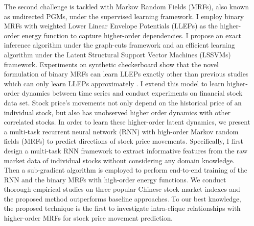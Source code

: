 The second challenge is tackled with Markov Random Fields (MRFs),
also known as undirected PGMs, under the supervised learning
framework. I employ binary MRFs with weighted Lower Linear
Envelope Potentials (LLEPs) as the higher-order energy function
to capture higher-order dependencies. I propose an exact
inference algorithm under the graph-cuts framework and an
efficient learning algorithm under the Latent Structural Support
Vector Machines (LSSVMs) framework. Experiments on synthetic
checkerboard show that the novel formulation of binary MRFs can
learn LLEPs exactly other than previous studies which can only
learn LLEPs approximately
\cite{gouldlearning,narayanaswamy2017learning}. I extend this
model to learn higher-order dynamics between time series and
conduct experiments on financial stock data set. Stock price's
movements not only depend on the historical price of an
individual stock, but also has unobserved higher order dynamics
with other correlated stocks. In order to learn these
higher-order latent dynamics, we present a multi-task recurrent
neural network (RNN) with high-order Markov random fields (MRFs)
to predict directions of stock price movements. Specifically, I
first design a multi-task RNN framework to extract informative
features from the raw market data of individual stocks without
considering any domain knowledge. Then a sub-gradient algorithm
is employed to perform end-to-end training of the RNN and the
binary MRFs with high-order energy functions. We conduct thorough
empirical studies on three popular Chinese stock market indexes
and the proposed method outperforms baseline approaches. To our
best knowledge, the proposed technique is the first to
investigate intra-clique relationships with higher-order MRFs for
stock price movement prediction.


